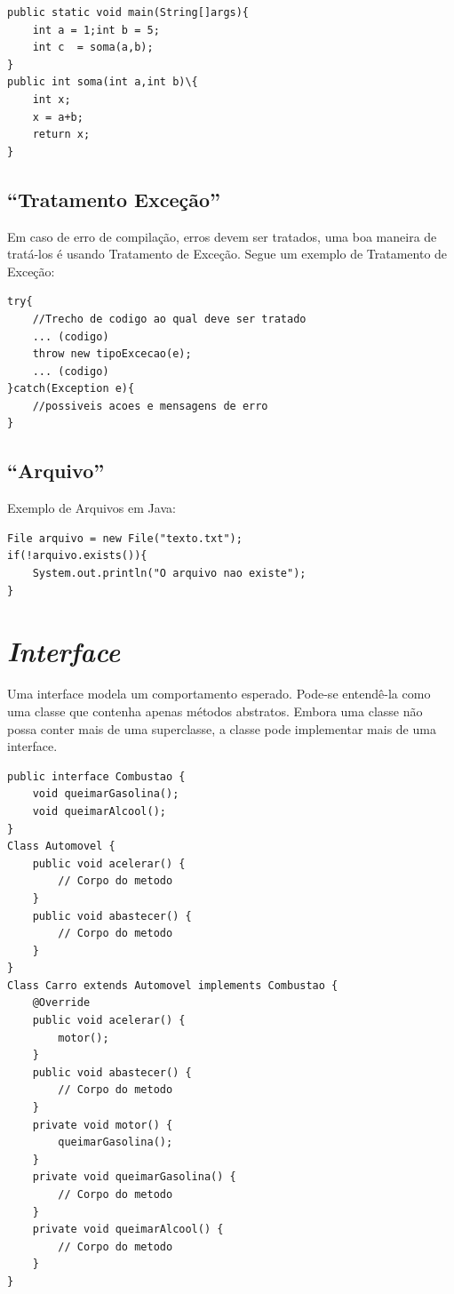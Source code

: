 \documentclass[
	12pt,				%
	openright,			%
	oneside,			%
	a4paper,			%
	english,			%
	french,				%
	spanish,			%
	brazil				%
	]{abntex2}
\begin{document}
\begin{lstlisting}
public static void main(String[]args){ 
	int a = 1;int b = 5;
	int c  = soma(a,b);
}
public int soma(int a,int b)\{ 
	int x;
	x = a+b;
	return x;
}
\end{lstlisting}

\subsection{“Tratamento Exceção”}

Em caso de erro de compilação, erros devem ser tratados, uma boa maneira de tratá-los é usando Tratamento de Exceção. Segue um exemplo de Tratamento de Exceção:

\begin{lstlisting}
try{ 
	//Trecho de codigo ao qual deve ser tratado
	... (codigo)
	throw new tipoExcecao(e);
    ... (codigo)
}catch(Exception e){ 
	//possiveis acoes e mensagens de erro
}
\end{lstlisting}


\subsection{“Arquivo”}
Exemplo de Arquivos em Java:

\begin{lstlisting}
File arquivo = new File("texto.txt");
if(!arquivo.exists()){
	System.out.println("O arquivo nao existe");
}
\end{lstlisting}

\section{\textit{Interface}}

Uma interface modela um comportamento esperado. Pode-se entendê-la como uma
classe que contenha apenas métodos abstratos. Embora uma classe não possa conter mais
de uma superclasse, a classe pode implementar mais de uma interface.

\begin{lstlisting}
public interface Combustao {
	void queimarGasolina();
	void queimarAlcool();
}
Class Automovel {
	public void acelerar() {
		// Corpo do metodo
	}
	public void abastecer() {
		// Corpo do metodo
	}
}
Class Carro extends Automovel implements Combustao {
	@Override
	public void acelerar() {
		motor();
	}
	public void abastecer() {
		// Corpo do metodo
	}
	private void motor() {
		queimarGasolina();
	}
	private void queimarGasolina() {
		// Corpo do metodo
	}
	private void queimarAlcool() {
		// Corpo do metodo
	}
}
\end{lstlisting}
\end{document}
